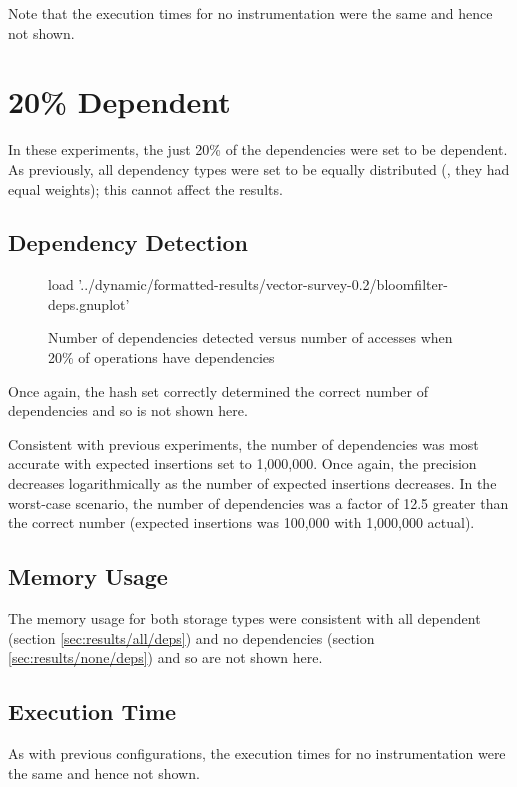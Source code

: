 	Note that the execution times for no instrumentation were the same and hence not shown.
	
\section{20\% Dependent} \label{sec:results/20}
	In these experiments, the just 20\% of the dependencies were set to be dependent. As previously, all dependency types were set to be equally distributed (\ie, they had equal weights); this cannot affect the results.

	\subsection{Dependency Detection} \label{sec:results/20/deps}
	\begin{figure}
		\centering
		\begin{gnuplot}[terminal=pdf]
			load '../dynamic/formatted-results/vector-survey-0.2/bloomfilter-deps.gnuplot'
		\end{gnuplot}
		\caption{Number of dependencies detected versus number of accesses when 20\% of operations have dependencies}
		\label{chart:20-dep}
	\end{figure}
	
	Once again, the hash set correctly determined the correct number of dependencies and so is not shown here.
	
	Consistent with previous experiments, the number of dependencies was most accurate with expected insertions set to 1,000,000. Once again, the precision decreases logarithmically as the number of expected insertions decreases. In the worst-case scenario, the number of dependencies was a factor of 12.5 greater than the correct number (expected insertions was 100,000 with 1,000,000 actual).
	
	\subsection{Memory Usage} \label{sec:results/20/mem}
	The memory usage for both storage types were consistent with all dependent (section \ref{sec:results/all/deps}) and no dependencies (section \ref{sec:results/none/deps}) and so are not shown here.
	
	\subsection{Execution Time} \label{sec:results/20/time}
	As with previous configurations, the execution times for no instrumentation were the same and hence not shown.
	
